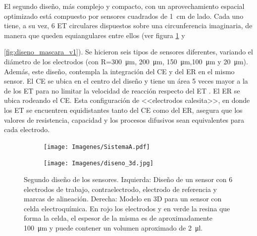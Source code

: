 		 	 El segundo diseño, más complejo y compacto, con un aprovechamiento espacial optimizado está compuesto por sensores cuadrados de \SI{1}{\cm} de lado. Cada uno tiene, a su vez, 6 ET circulares dispuestos sobre una circunferencia imaginaria, de manera que queden equiangulares entre ellos (ver figura \ref{fig:mascara_diseno_v2} y {\ref{fig:diseno_mascara_v1}). Se hicieron seis tipos de sensores diferentes, variando el diámetro de los electrodos (con R=\SI{300}{\um}, \SI{200}{\um}, \SI{150}{\um},\SI{100}{\um} y \SI{20}{\um}). Además, este diseño, contempla la integración del CE y del ER en el mismo sensor. El CE se ubica en el centro del diseño y tiene un área 5 veces mayor a la de los ET para no limitar la velocidad de reacción respecto del ET \cite{Wi2000}. El ER se ubica rodeando el CE. Esta configuración de <<electrodos calesita>>, en donde los ET se encuentren equidistantes tanto del CE como del ER, asegura que los valores de resistencia, capacidad y los procesos difusivos sean equivalentes para cada electrodo.\cite{Bockris1974}

			     \begin{figure}[b!]
			 	    \begin{subfigure}[t]{0.395\textwidth}
			       	\texttt{[image: Imagenes/SistemaA.pdf]}
			    	\end{subfigure}
					\begin{subfigure}[t]{0.595\textwidth}
			        \texttt{[image: Imagenes/diseno\_3d.jpg]}
			        \end{subfigure}
			     	\caption[Segundo diseño y máscara de los sensores]{Segundo diseño de los sensores. Izquierda: Diseño de un sensor con 6 electrodos de trabajo, contraelectrodo, electrodo de referencia y marcas de alineación. Derecha: Modelo en 3D para un sensor con celda electroquímica. En rojo los electrodos y en verde la resina que forma la celda, el espesor de la misma es de aproximadamente \SI{100}{\um} y puede contener un volumen aproximado de \SI{2}{\ul}.}
			     	\label{fig:mascara_diseno_v2}
			     	\end{figure}
	   
}
